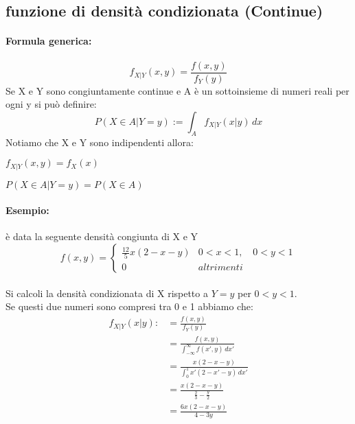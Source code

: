 \documentclass[]{article}
\newcommand{\formula}{\paragraph{Formula generica:}}
\begin{document}
    \subsection{funzione di densità condizionata (Continue)}
    \formula
    \[ f_{X|Y}(x,y) = \frac{f(x, y)}{f_Y(y)}\]
    Se X e Y sono congiuntamente continue e A è un sottoinsieme di numeri reali per ogni y si può definire:
    \[ P(X \in A | Y = y) := \int_{A}^{} f_{X|Y}(x|y) \, dx \]
    Notiamo che X e Y sono indipendenti allora:
    \begin{center}
        \begin{minipage}{0.45 \textwidth}
            $ f_{X|Y}(x,y) = f_X(x) $
        \end{minipage}
        \begin{minipage}{0.45 \textwidth}
            $ P(X \in A | Y = y) = P(X \in A) $
        \end{minipage}
    \end{center}

    \paragraph{Esempio:} è data la seguente densità congiunta di X e Y
    \begin{equation*}
        f(x,y) =
        \begin{cases}
            \frac{12}{5} x(2-x-y) & 0 < x < 1, \quad 0 < y < 1 \\
            0 & altrimenti
        \end{cases}
    \end{equation*} \\
    \linebreak[2]
    Si calcoli la densità condizionata di X rispetto a $Y = y$ per $0 < y < 1$. \\
    Se questi due numeri sono compresi tra 0 e 1 abbiamo che:
    \begin{equation*}
        \begin{split}
            f_{X|Y}(x|y):&= \frac{f(x,y)}{f_Y(y)} \\
            & = \frac{f(x, y)}{\int_{-\infty}^{\infty} f(x', y) \, dx'} \\
            & = \frac{x(2-x-y)}{\int_{0}^{1} x'(2-x'-y) \, dx'} \\
            & = \frac{x(2-x-y)}{\frac{2}{3} - \frac{y}{2}} \\
            & = \frac{6x(2-x-y)}{4-3y}
        \end{split}
    \end{equation*}
\end{document}
